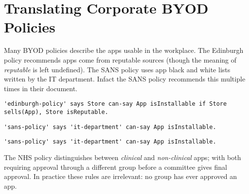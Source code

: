 \documentclass{easychair}
\begin{document}
\section{Translating Corporate BYOD Policies}
\label{sec:translation}

Many BYOD policies describe the apps usable in the workplace.
The Edinburgh policy recommends apps come from reputable sources (though the meaning of \emph{reputable} is left undefined). 
The SANS policy uses app black and white lists written by the IT department.
Infact the SANS policy recommends this multiple times in their document.
\begin{lstlisting}[title={\footnotesize\textbf{Edinburgh}:~\itshape ``Only download applications (‘apps’) or other software from reputable sources.''}]
'edinburgh-policy' says Store can-say App isInstallable if Store sells(App), Store isReputable.
\end{lstlisting}
\begin{lstlisting}[title={\footnotesize\textbf{SANS}:~\itshape ``The IT Department maintains a list of allowed and unauthorized applications and makes them available to users on the intranet.''}]
'sans-policy' says 'it-department' can-say App isInstallable.
\end{lstlisting}
\begin{lstlisting}[title={\footnotesize\textbf{SANS}:~\itshape ``Only approved third party applications can be
installed on handhelds. The approved list can be
obtained by contacting the IT department, or should be
available on the intranet.''}]
'sans-policy' says 'it-department' can-say App isInstallable.
\end{lstlisting}
The NHS policy distinguishes between \emph{clinical} and \emph{non-clinical} apps;
    with both requiring approval through a different group before a committee gives final approval.
In practice these rules are irrelevant: no group has ever approved an app.
\end{document}
